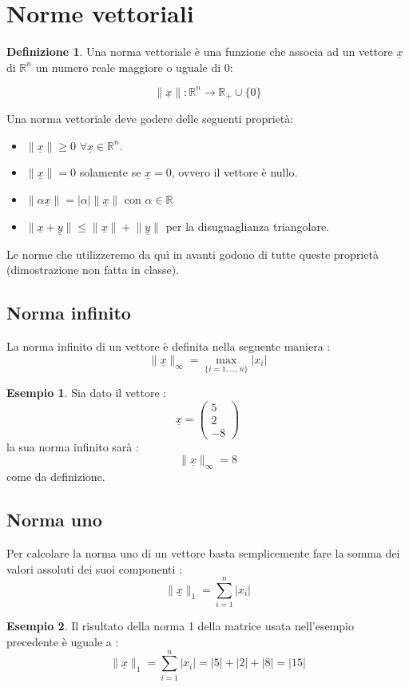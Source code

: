 \documentclass[12pt, a4paper]{book}
\theoremstyle{definition}
\newtheorem{exmp}{Esempio}[section]
\newtheorem{defn}{Definizione}[section]
\newcommand{\VarMtrx}[1]{\ensuremath{\underline{#1}}}
\begin{document}
\section{Norme vettoriali}
\begin{flushleft}
\begin{defn}
Una norma vettoriale è una funzione che associa ad un vettore \VarMtrx{x} di $\mathbb{R}^{n}$ un numero reale maggiore o uguale di 0: 

\[ \lVert \VarMtrx{x} \rVert :  \mathbb{R}^{n} \longrightarrow \mathbb{R}_{+} \cup \{0\} \]
\end{defn}
Una norma vettoriale deve godere delle seguenti proprietà: 
\begin{itemize}
	\item $\lVert \VarMtrx{x} \rVert \geq 0$ $\forall \VarMtrx{x} \in \mathbb{R}^{n}$.
	\item $\lVert \VarMtrx{x} \rVert = 0$ solamente se $\VarMtrx{x} = 0$, ovvero il vettore è nullo.
	\item $\lVert\alpha \VarMtrx{x}\rVert = |\alpha|\lVert\VarMtrx{x}\rVert$ con $\alpha \in \mathbb{R}$
	\item $\lVert \VarMtrx{x} + \VarMtrx{y}\rVert \leq \lVert \VarMtrx{x}\rVert + \lVert\VarMtrx{y}\rVert$ per la disuguaglianza triangolare.
\end{itemize}
Le norme che utilizzeremo da quì in avanti godono di tutte queste proprietà (dimostrazione non fatta in classe).  
\end{flushleft}

\subsection{Norma infinito}
\begin{flushleft}
La norma infinito di un vettore è definita nella seguente maniera : 
\[ \lVert\VarMtrx{x}\rVert_{\infty}  = \max_{\{i = 1,...,n\}} |x_{i}| \]

\begin{exmp}
Sia dato il vettore :
\[ \VarMtrx{x} = \begin{pmatrix} 5 \\ 2 \\ -8  \end{pmatrix} \]
la sua norma infinito sarà : 
\[ \lVert\VarMtrx{x}\rVert_{\infty}  = 8\]
come da definizione. 
\end{exmp}
\end{flushleft}

\subsection{Norma uno}
\begin{flushleft}
Per calcolare la norma uno di un vettore basta semplicemente fare la somma dei valori assoluti dei suoi componenti : 
\[ \lVert\VarMtrx{x}\rVert_{1}  =\sum_{i=1}^{n} |x_{i}| \]

\begin{exmp}
Il risultato della norma 1 della matrice usata nell'esempio precedente è uguale a : 
\[ \lVert\VarMtrx{x}\rVert_{1}  =\sum_{i=1}^{n} |x_{i}|  = |5| + |2| + |8| = |15| \]
\end{exmp}
\end{flushleft}
\end{document}
